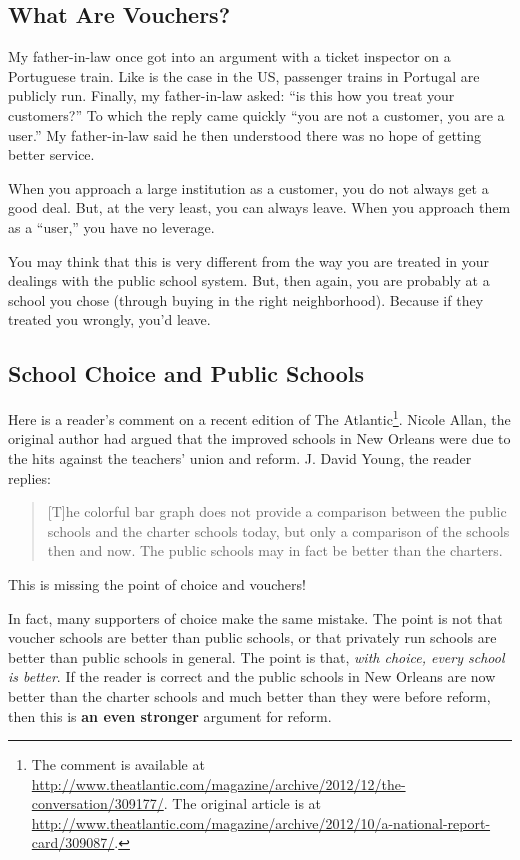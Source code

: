 \subsection{What Are Vouchers?}

My father-in-law once got into an argument with a ticket inspector on a
Portuguese train. Like is the case in the US, passenger trains in Portugal are
publicly run. Finally, my father-in-law asked: ``is this how you treat your
customers?'' To which the reply came quickly ``you are not a customer, you are
a user.'' My father-in-law said he then understood there was no hope of getting
better service.

When you approach a large institution as a customer, you do not always get a
good deal. But, at the very least, you can always leave. When you approach them
as a ``user,'' you have no leverage.

You may think that this is very different from the way you are treated in your
dealings with the public school system. But, then again, you are probably at a
school you chose (through buying in the right neighborhood). Because if they
treated you wrongly, you'd leave.

\subsection{School Choice and Public Schools}

Here is a reader's comment on a recent edition of The Atlantic\footnote{The
comment is available at
\url{http://www.theatlantic.com/magazine/archive/2012/12/the-conversation/309177/}.
The original article is at
\url{http://www.theatlantic.com/magazine/archive/2012/10/a-national-report-card/309087/}.}.
Nicole Allan, the original author had argued that the improved schools in New
Orleans were due to the hits against the teachers' union and reform. J. David
Young, the reader replies:

\begin{quote}
    [T]he colorful bar graph does not provide a comparison between the public
    schools and the charter schools today, but only a comparison of the schools
    then and now. The public schools may in fact be better than the charters.
\end{quote}

This is missing the point of choice and vouchers!

In fact, many supporters of choice make the same mistake. The point is not that
voucher schools are better than public schools, or that privately run schools
are better than public schools in general. The point is that, \emph{with
choice, every school is better}. If the reader is correct and the public
schools in New Orleans are now better than the charter schools and much better
than they were before reform, then this is \textbf{an even stronger} argument
for reform.

